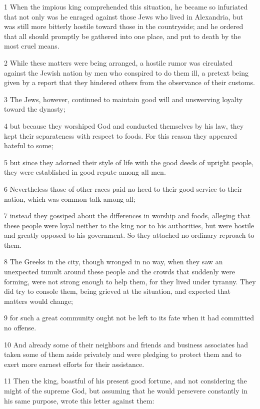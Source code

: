 \par 1 When the impious king comprehended this situation, he became so infuriated that not only was he enraged against those Jews who lived in Alexandria, but was still more bitterly hostile toward those in the countryside; and he ordered that all should promptly be gathered into one place, and put to death by the most cruel means.
\par 2 While these matters were being arranged, a hostile rumor was circulated against the Jewish nation by men who conspired to do them ill, a pretext being given by a report that they hindered others from the observance of their customs.
\par 3 The Jews, however, continued to maintain good will and unswerving loyalty toward the dynasty;
\par 4 but because they worshiped God and conducted themselves by his law, they kept their separateness with respect to foods. For this reason they appeared hateful to some;
\par 5 but since they adorned their style of life with the good deeds of upright people, they were established in good repute among all men.
\par 6 Nevertheless those of other races paid no heed to their good service to their nation, which was common talk among all;
\par 7 instead they gossiped about the differences in worship and foods, alleging that these people were loyal neither to the king nor to his authorities, but were hostile and greatly opposed to his government. So they attached no ordinary reproach to them.
\par 8 The Greeks in the city, though wronged in no way, when they saw an unexpected tumult around these people and the crowds that suddenly were forming, were not strong enough to help them, for they lived under tyranny. They did try to console them, being grieved at the situation, and expected that matters would change;
\par 9 for such a great community ought not be left to its fate when it had committed no offense.
\par 10 And already some of their neighbors and friends and business associates had taken some of them aside privately and were pledging to protect them and to exert more earnest efforts for their assistance.
\par 11 Then the king, boastful of his present good fortune, and not considering the might of the supreme God, but assuming that he would persevere constantly in his same purpose, wrote this letter against them:
